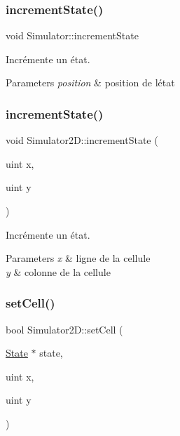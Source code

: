 \subsubsection{\texorpdfstring{increment\+State()}{incrementState()}\hspace{0.1cm}{\footnotesize\ttfamily [1/2]}}
{\footnotesize\ttfamily void Simulator\+::increment\+State}



Incrémente un état. 


\begin{DoxyParams}{Parameters}
{\em position} & position de l\textquotesingle{}état \\
\hline
\end{DoxyParams}
\mbox{\label{class_simulator2_d_aaaf3a1680a083756edfc6f3c09b64b38}} 
\subsubsection{\texorpdfstring{increment\+State()}{incrementState()}\hspace{0.1cm}{\footnotesize\ttfamily [2/2]}}
{\footnotesize\ttfamily void Simulator2\+D\+::increment\+State (\begin{DoxyParamCaption}\item[{uint}]{x,  }\item[{uint}]{y }\end{DoxyParamCaption})}



Incrémente un état. 


\begin{DoxyParams}{Parameters}
{\em x} & ligne de la cellule \\
\hline
{\em y} & colonne de la cellule \\
\hline
\end{DoxyParams}
\mbox{\label{class_simulator2_d_abeeb707f6eef5355d94e41848bdffc56}} 
\subsubsection{\texorpdfstring{set\+Cell()}{setCell()}\hspace{0.1cm}{\footnotesize\ttfamily [1/2]}}
{\footnotesize\ttfamily bool Simulator2\+D\+::set\+Cell (\begin{DoxyParamCaption}\item[{\mbox{\hyperlink{class_state}{State}} $\ast$}]{state,  }\item[{uint}]{x,  }\item[{uint}]{y }\end{DoxyParamCaption})}



